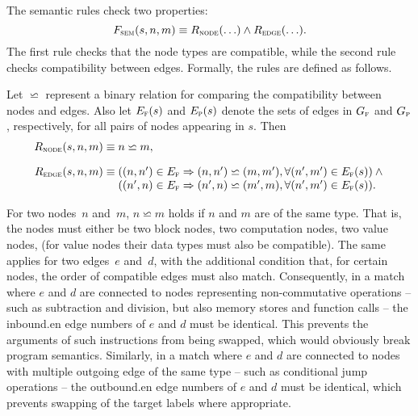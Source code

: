 \def\mAttrCmp{\backsimeq}%
\def\mSemNodeRule{R_{\mathsc{node}}}
\def\mSemEdgeRule{R_{\mathsc{edge}}}

The semantic rules check two properties:
%
\begin{equation}
  \mSemRuleCheck(s, n, m) \equiv
  \mSemNodeRule(\ldots) \mAnd \mSemEdgeRule(\ldots).
\end{equation}
%
The first rule checks that the \gls{node} types are compatible, while the second
rule checks compatibility between \glspl{edge}.
%
Formally, the rules are defined as follows.
%
\begin{definition}
  Let $\mAttrCmp$ represent a binary relation for comparing the compatibility
  between \glspl{node} and \glspl{edge}.
  Also let $E_{\textrm{\textsc{f}}}(s)$ and $E_{\textrm{\textsc{p}}}(s)$ denote the sets of \glspl{edge} in $G_{\textrm{\textsc{f}}}$ and
  $G_{\textrm{\textsc{p}}}$, respectively, for all pairs of \glspl{node} appearing in $s$.
  Then
  \begin{displaymath}
    \begin{array}{r@{}l}
        \mSemNodeRule(s, n, m) \equiv \mbox{}
      & n \mAttrCmp m, \\[\abovedisplayskip]
        \mSemEdgeRule(s, n, m) \equiv \mbox{}
      & \left(
        \mPair{n}{n'} \in \fE \mImp \mPair{n}{n'} \mAttrCmp \mPair{m}{m'},
        \forall \mPair{n'}{m'} \in \fE(s)
        \right) \mAnd \mbox{} \\
      & \left(
        \mPair{n'}{n} \in \fE \mImp \mPair{n'}{n} \mAttrCmp \mPair{m'}{m},
        \forall \mPair{n'}{m'} \in \fE(s)
        \right)\!.
    \end{array}
  \end{displaymath}%
\end{definition}

For two \glspl{node}~$n$ and~$m$, \mbox{$n \mAttrCmp m$} holds if $n$ and $m$
are of the same type.
%
That is, the \glspl{node} must either be two \glspl{block node}, two
\glspl{computation node}, two \glspl{value node}, \etc (for \glspl{value node}
their data types must also be compatible).
%
The same applies for two \glspl{edge}~$e$ and~$d$, with the additional condition
that, for certain \glspl{node}, the order of compatible \glspl{edge} must also
match.
%
Consequently, in a \gls{match} where $e$ and $d$ are connected to \glspl{node}
representing non-commutative \glspl{operation} -- such as subtraction and
division, but also memory stores and function calls -- the \gls{inbound.en}
\glspl{edge number} of $e$ and $d$ must be identical.
%
This prevents the arguments of such \glspl{instruction} from being swapped,
which would obviously break \gls{program} semantics.
%
Similarly, in a \gls{match} where $e$ and $d$ are connected to \glspl{node} with
multiple outgoing \gls{edge} of the same type -- such as conditional jump
\glspl{operation} -- the \gls{outbound.en} \glspl{edge number} of $e$ and $d$
must be identical, which prevents swapping of the target labels where
appropriate.


